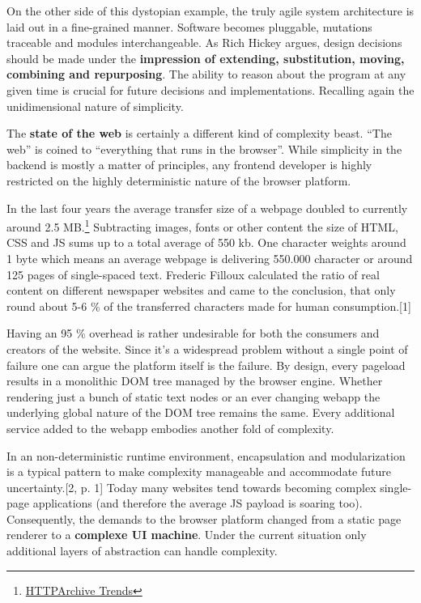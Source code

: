 \documentclass[]{assets/latex/ieee}
\begin{document}
On the other side of this dystopian example, the truly agile system
architecture is laid out in a fine-grained manner. Software becomes
pluggable, mutations traceable and modules interchangeable. As Rich
Hickey argues, design decisions should be made under the
\textbf{impression of extending, substitution, moving, combining and
repurposing}. The ability to reason about the program at any given time
is crucial for future decisions and implementations. Recalling again the
unidimensional nature of simplicity.

The \textbf{state of the web} is certainly a different kind of
complexity beast. ``The web'' is coined to ``everything that runs in the
browser''. While simplicity in the backend is mostly a matter of
principles, any frontend developer is highly restricted on the highly
deterministic nature of the browser platform.

In the last four years the average transfer size of a webpage doubled to
currently around 2.5 MB.\footnote{\href{http://httparchive.org/trends.php}{HTTPArchive
  Trends}} Subtracting images, fonts or other content the size of HTML,
CSS and JS sums up to a total average of 550 kb. One character weights
around 1 byte which means an average webpage is delivering 550.000
character or around 125 pages of single-spaced text. Frederic Filloux
calculated the ratio of real content on different newspaper websites and
came to the conclusion, that only round about 5-6 \% of the transferred
characters made for human consumption.{[}1{]}

Having an 95 \% overhead is rather undesirable for both the consumers
and creators of the website. Since it's a widespread problem without a
single point of failure one can argue the platform itself is the
failure. By design, every pageload results in a monolithic DOM tree
managed by the browser engine. Whether rendering just a bunch of static
text nodes or an ever changing webapp the underlying global nature of
the DOM tree remains the same. Every additional service added to the
webapp embodies another fold of complexity.

In an non-deterministic runtime environment, encapsulation and
modularization is a typical pattern to make complexity manageable and
accommodate future uncertainty.{[}2, p. 1{]} Today many websites tend
towards becoming complex single-page applications (and therefore the
average JS payload is soaring too). Consequently, the demands to the
browser platform changed from a static page renderer to a
\textbf{complexe UI machine}. Under the current situation only
additional layers of abstraction can handle complexity.
\end{document}
